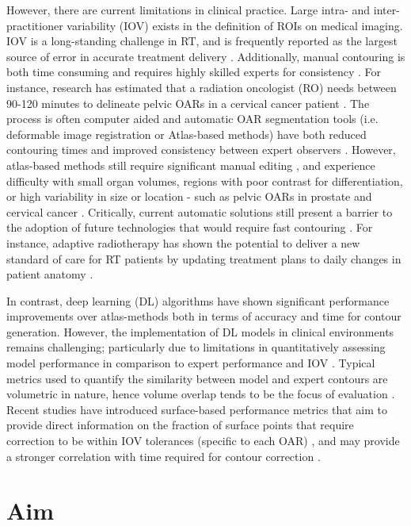 However, there are current limitations in clinical practice. Large intra- and inter-practitioner variability (IOV) exists in the definition of ROIs on medical imaging. IOV is a long-standing challenge in RT, and is frequently reported as the largest source of error in accurate treatment delivery \cite{Vinod_2016}. Additionally, manual contouring is both time consuming and requires highly skilled experts for consistency \cite{Nikolov_2018}. For instance, research has estimated that a radiation oncologist (RO) needs between 90-120 minutes to delineate pelvic OARs in a cervical cancer patient \cite{Liu_2020}. The process is often computer aided and automatic OAR segmentation tools (i.e. deformable image registration or Atlas-based methods) have both reduced contouring times and improved consistency between expert observers \cite{Vinod_2016}. However, atlas-based methods still require significant manual editing \cite{Nikolov_2018}, and experience difficulty with small organ volumes, regions with poor contrast for differentiation, or high variability in size or location - such as pelvic OARs in prostate and cervical cancer \cite{Schreier_2020, Liu_2020}. Critically, current automatic solutions still present a barrier to the adoption of future technologies that would require fast contouring \cite{Nikolov_2018}. For instance, adaptive radiotherapy has shown the potential to deliver a new standard of care for RT patients by updating treatment plans to daily changes in patient anatomy \cite{Nikolov_2018}. 

In contrast, deep learning (DL) algorithms have shown significant performance improvements over atlas-methods both in terms of accuracy and time for contour generation. However, the implementation of DL models in clinical environments remains challenging; particularly due to limitations in quantitatively assessing model performance in comparison to expert performance and IOV \cite{Nikolov_2018}. Typical metrics used to quantify the similarity between model and expert contours are volumetric in nature, hence volume overlap tends to be the focus of evaluation \cite{Nikolov_2018}. Recent studies have introduced surface-based performance metrics that aim to provide direct information on the fraction of surface points that require correction to be within IOV tolerances (specific to each OAR) \cite{Nikolov_2018, Vaassen_2020}, and may provide a stronger correlation with time required for contour correction \cite{Vaassen_2020}.

\section{Aim}

